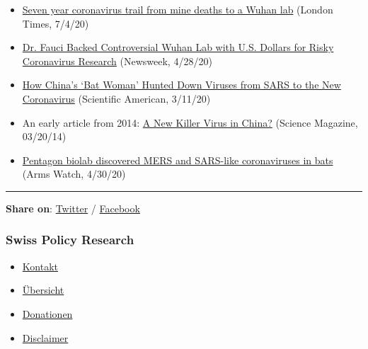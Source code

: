 \begin{itemize}
\tightlist
\item
  \href{https://www.thetimes.co.uk/article/seven-year-covid-trail-revealed-l5vxt7jqp}{Seven
  year coronavirus trail from mine deaths to a Wuhan lab} (London Times,
  7/4/20)
\item
  \href{https://www.newsweek.com/dr-fauci-backed-controversial-wuhan-lab-millions-us-dollars-risky-coronavirus-research-1500741}{Dr.
  Fauci Backed Controversial Wuhan Lab with U.S. Dollars for Risky
  Coronavirus Research} (Newsweek, 4/28/20)
\item
  \href{https://www.scientificamerican.com/article/how-chinas-bat-woman-hunted-down-viruses-from-sars-to-the-new-coronavirus1/}{How
  China's `Bat Woman' Hunted Down Viruses from SARS to the New
  Coronavirus} (Scientific American, 3/11/20)
\item
  An early article from 2014:
  \href{https://www.sciencemag.org/news/2014/03/new-killer-virus-china}{A
  New Killer Virus in China?} (Science Magazine, 03/20/14)
\item
  \href{https://armswatch.com/project-g-2101-pentagon-biolab-discovered-mers-and-sars-like-coronaviruses-in-bats/}{Pentagon
  biolab discovered MERS and SARS-like coronaviruses in bats} (Arms
  Watch, 4/30/20)
\end{itemize}

\begin{center}\rule{0.5\linewidth}{\linethickness}\end{center}

\textbf{Share on}:
\href{https://twitter.com/intent/tweet?url=https://swprs.org/covid-19-virus-origin-the-mojiang-miners-passage-hypothesis/}{Twitter}
/
\href{https://www.facebook.com/share.php?u=https://swprs.org/covid-19-virus-origin-the-mojiang-miners-passage-hypothesis/}{Facebook}

\hypertarget{swiss-policy-research}{%
\subsubsection{Swiss Policy Research}\label{swiss-policy-research}}

\begin{itemize}
\tightlist
\item
  \href{https://swprs.org/kontakt/}{Kontakt}
\item
  \href{https://swprs.org/uebersicht/}{Übersicht}
\item
  \href{https://swprs.org/donationen/}{Donationen}
\item
  \href{https://swprs.org/disclaimer/}{Disclaimer}
\end{itemize}

